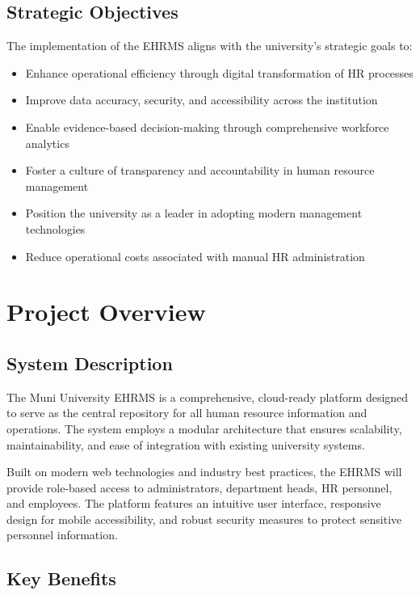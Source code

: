 \documentclass[12pt]{article}
\begin{document}
\subsection{Strategic Objectives}

The implementation of the EHRMS aligns with the university's strategic goals to:

\begin{itemize}[noitemsep]
\item Enhance operational efficiency through digital transformation of HR processes
\item Improve data accuracy, security, and accessibility across the institution
\item Enable evidence-based decision-making through comprehensive workforce analytics
\item Foster a culture of transparency and accountability in human resource management
\item Position the university as a leader in adopting modern management technologies
\item Reduce operational costs associated with manual HR administration
\end{itemize}

\section{Project Overview}

\subsection{System Description}

The Muni University EHRMS is a comprehensive, cloud-ready platform designed to serve as the central repository for all human resource information and operations. The system employs a modular architecture that ensures scalability, maintainability, and ease of integration with existing university systems.

Built on modern web technologies and industry best practices, the EHRMS will provide role-based access to administrators, department heads, HR personnel, and employees. The platform features an intuitive user interface, responsive design for mobile accessibility, and robust security measures to protect sensitive personnel information.

\subsection{Key Benefits}
\end{document}
